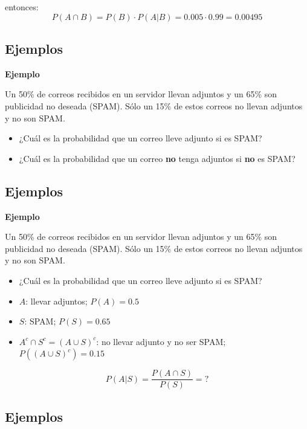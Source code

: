 \documentclass[]{book}
\providecommand{\tightlist}{%
  \setlength{\itemsep}{0pt}\setlength{\parskip}{0pt}}
\begin{document}
entonces:
\[P(A\cap B)=P(B)\cdot P(A|B)=0.005\cdot 0.99=0.00495\]

\hypertarget{ejemplos-1}{%
\subsection{Ejemplos}\label{ejemplos-1}}

\textbf{Ejemplo}

Un 50\% de correos recibidos en un servidor llevan adjuntos y un 65\% son publicidad no deseada (SPAM). Sólo un 15\% de estos correos no llevan adjuntos y no son SPAM.

\begin{itemize}
\tightlist
\item
  ¿Cuál es la probabilidad que un correo lleve adjunto si es SPAM?
\item
  ¿Cuál es la probabilidad que un correo \textbf{no} tenga adjuntos si \textbf{no} es SPAM?
\end{itemize}

\hypertarget{ejemplos-2}{%
\subsection{Ejemplos}\label{ejemplos-2}}

\textbf{Ejemplo}

Un 50\% de correos recibidos en un servidor llevan adjuntos y un 65\% son publicidad no deseada (SPAM). Sólo un 15\% de estos correos no llevan adjuntos y no son SPAM.

\begin{itemize}
\tightlist
\item
  ¿Cuál es la probabilidad que un correo lleve adjunto si es SPAM?
\end{itemize}

\begin{itemize}
\tightlist
\item
  \(A\): llevar adjuntos; \(P(A)=0.5\)
\item
  \(S\): SPAM; \(P(S)=0.65\)
\item
  \(A^c\cap S^c=(A\cup S)^c\): no llevar adjunto y no ser SPAM; \(P((A\cup S)^c)=0.15\)
\end{itemize}

\[P(A|S)=\dfrac{P(A\cap S)}{P(S)}=?\]

\hypertarget{ejemplos-3}{%
\subsection{Ejemplos}\label{ejemplos-3}}
\end{document}
